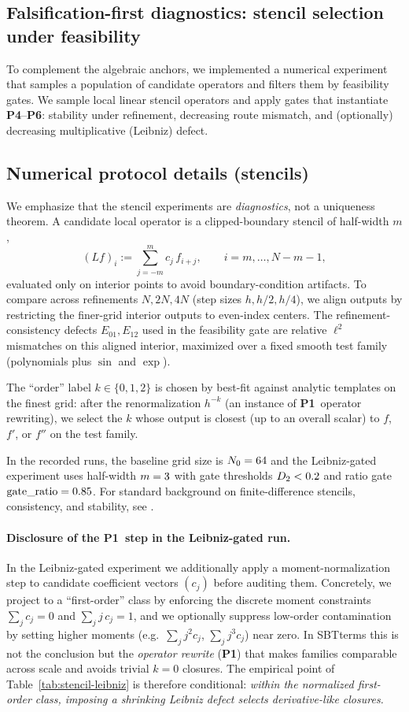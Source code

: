 \documentclass[apajournal,article,submit,moreauthors,pdftex]{Definitions/mdpi}
\newcommand{\SBT}{\textsc{SBT}}
\newcommand{\Pone}{\textbf{P1}}
\newcommand{\Pfour}{\textbf{P4}}
\newcommand{\Psix}{\textbf{P6}}
\begin{document}
\subsection{Falsification-first diagnostics: stencil selection under feasibility}
To complement the algebraic anchors, we implemented a numerical experiment that samples a population of candidate operators and filters them by feasibility gates.
We sample local linear stencil operators and apply gates that instantiate \Pfour--\Psix:
stability under refinement, decreasing route mismatch, and (optionally) decreasing multiplicative (Leibniz) defect.

\subsection{Numerical protocol details (stencils)}
We emphasize that the stencil experiments are \emph{diagnostics}, not a uniqueness theorem.
A candidate local operator is a clipped-boundary stencil of half-width $m$,
\[
  (L f)_i := \sum_{j=-m}^{m} c_j\, f_{i+j},
  \qquad i=m,\dots,N-m-1,
\]
evaluated only on interior points to avoid boundary-condition artifacts.
To compare across refinements $N,2N,4N$ (step sizes $h, h/2, h/4$), we align outputs by restricting the finer-grid interior outputs to even-index centers.
The refinement-consistency defects $E_{01},E_{12}$ used in the feasibility gate are relative $\ell^2$ mismatches on this aligned interior, maximized over a fixed smooth test family (polynomials plus $\sin$ and $\exp$).

The ``order'' label $k\in\{0,1,2\}$ is chosen by best-fit against analytic templates on the finest grid:
after the renormalization $h^{-k}$ (an instance of \Pone\ operator rewriting), we select the $k$ whose output is closest (up to an overall scalar) to $f$, $f'$, or $f''$ on the test family.

In the recorded runs, the baseline grid size is $N_0=64$ and the Leibniz-gated experiment uses half-width $m=3$ with gate thresholds $D_2<0.2$ and ratio gate $\mathrm{gate\_ratio}=0.85$.
For standard background on finite-difference stencils, consistency, and stability, see \cite{LeVeque2007}.

\paragraph{Disclosure of the \Pone\ step in the Leibniz-gated run.}
In the Leibniz-gated experiment we additionally apply a moment-normalization step to candidate coefficient vectors $(c_j)$ before auditing them.
Concretely, we project to a ``first-order'' class by enforcing the discrete moment constraints
$\sum_j c_j=0$ and $\sum_j j\,c_j = 1$, and we optionally suppress low-order contamination by setting higher moments (e.g.\ $\sum_j j^2 c_j$, $\sum_j j^3 c_j$) near zero.
In \SBT terms this is not the conclusion but the \emph{operator rewrite} (\Pone) that makes families comparable across scale and avoids trivial $k=0$ closures.
The empirical point of Table~\ref{tab:stencil-leibniz} is therefore conditional:
\emph{within the normalized first-order class, imposing a shrinking Leibniz defect selects derivative-like closures.}
\end{document}
